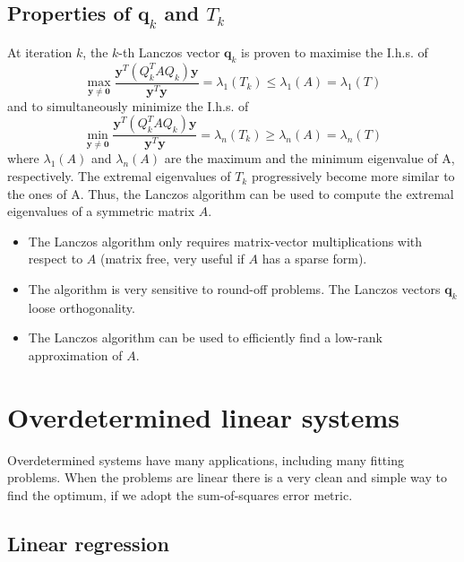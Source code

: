 \documentclass[11pt]{book}
\begin{document}
\section*{Properties of $\mathbf{q}_{k}$ and $T_{k}$}
At iteration $k$, the $k$-th Lanczos vector $\mathbf{q}_{k}$ is proven to maximise the I.h.s. of
$$
\max _{\mathbf{y} \neq \mathbf{0}} \frac{\mathbf{y}^{T}\left(Q_{k}^{T} A Q_{k}\right) \mathbf{y}}{\mathbf{y}^{T} \mathbf{y}}=\lambda_{1}\left(T_{k}\right) \leq \lambda_{1}(A)=\lambda_{1}(T)
$$
and to simultaneously minimize the I.h.s. of
$$
\min _{\mathbf{y} \neq \mathbf{0}} \frac{\mathbf{y}^{T}\left(Q_{k}^{T} A Q_{k}\right) \mathbf{y}}{\mathbf{y}^{T} \mathbf{y}}=\lambda_{n}\left(T_{k}\right) \geq \lambda_{n}(A)=\lambda_{n}(T)
$$
where $\lambda_{1}(A)$ and $\lambda_{n}(A)$ are the maximum and the minimum eigenvalue of $\mathrm{A}$, respectively.
The extremal eigenvalues of $T_{k}$ progressively become more similar to the ones of $\mathrm{A}$. Thus, the Lanczos algorithm can be used to compute the extremal eigenvalues of a symmetric matrix $A$.
\begin{itemize}
  \item The Lanczos algorithm only requires matrix-vector multiplications with respect to $A$ (matrix free, very useful if $A$ has a sparse form).

  \item The algorithm is very sensitive to round-off problems. The Lanczos vectors $\mathbf{q}_{k}$ loose orthogonality.

  \item The Lanczos algorithm can be used to efficiently find a low-rank approximation of $A$.

\end{itemize}

\chapter{Overdetermined linear systems}
Overdetermined systems have many applications, including many fitting problems.
When the problems are linear there is a very clean and simple way to find the optimum, if we adopt the sum-of-squares error metric.

\section*{Linear regression}
\end{document}
